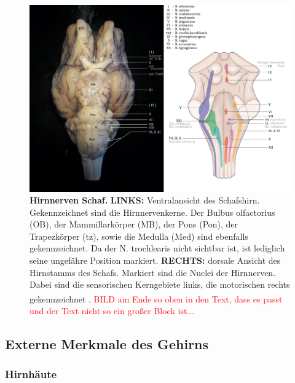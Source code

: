 \documentclass[12pt,a4paper,pdftex]{article}
\begin{document}
\begin{figure}[H]
    \centering
    \includegraphics[width=\textwidth]{pictures/Bilder_Jule/Schaf/Aussenansicht/Hirnnerven.png}
    \caption[Hirnnerven Schaf]{\textbf{Hirnnerven Schaf.} \textbf{LINKS:} Ventralansicht des Schafshirn. Gekennzeichnet sind die Hirnnervenkerne. Der Bulbus olfactorius (OB), der Mammillarkörper (MB), der Pons (Pon), der Trapezkörper (tz), sowie die Medulla (Med) sind ebenfalls gekennzeichnet. Da der N. trochlearis nicht sichtbar ist, ist lediglich seine ungefähre Position markiert. \textbf{RECHTS:} dorsale Ansicht des Hirnstamms des Schafs. Markiert sind die Nuclei der Hirnnerven. Dabei sind die sensorischen Kerngebiete links, die motorischen rechts gekennzeichnet \textsuperscript{\cite[10]{crossman2014neuroanatomy}}. \textcolor{red}{BILD am Ende so oben in den Text, dass es passt und der Text nicht so ein großer Block ist...}}
    \label{fig:hirnnerven_schaf}
\end{figure}{}


\subsection{Externe Merkmale des Gehirns}
\label{subsec:Externe_Merkmale}

\subsubsection{Hirnhäute} 
\end{document}
